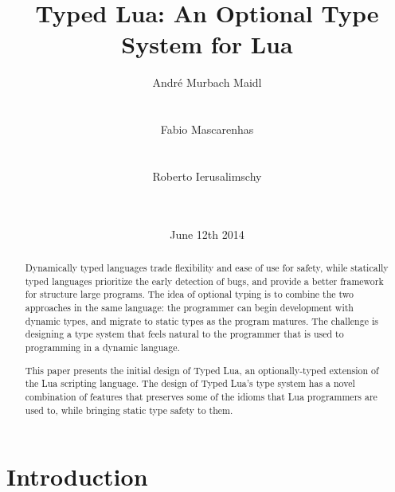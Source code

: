 \documentclass[preprint]{sig-alternate}
\begin{document}

\title{Typed Lua: An Optional Type System for Lua}


\author{
\alignauthor
André Murbach Maidl\\
  \\
  \\
\alignauthor
Fabio Mascarenhas\\
  \\
  \\
\alignauthor
Roberto Ierusalimschy\\
  \\
  \\
}

\date{June 12th 2014}

\maketitle

\begin{abstract}
Dynamically typed languages trade flexibility and ease of
use for safety, while statically typed languages prioritize
the early detection of bugs, and provide a better framework
for structure large programs. The idea of optional typing
is to combine the two approaches in the same
language: the programmer can begin development with
dynamic types, and migrate to static types as the
program matures. The challenge is designing a type system
that feels natural to the programmer that is used to
programming in a dynamic language.

This paper presents the initial design of Typed Lua, an
optionally-typed extension of the Lua scripting language.
The design of Typed Lua's type system has a novel combination
of features that preserves some of the idioms that Lua
programmers are used to, while bringing static type
safety to them.
\end{abstract}


\section{Introduction} \label{sec:intro}
\end{document}
